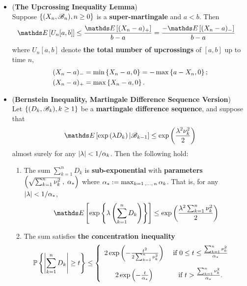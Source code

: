 \documentclass[11pt]{article}
\begin{document}
\begin{itemize}
\item \begin{lemma}(\textbf{The Upcrossing Inequality Lemma}) \citep{billingsley2008probability} \\
Suppose $\left\{(X_n, {\mathscr B}_n), n \ge 0\right\}$ is a \textbf{super-martingale} and $a < b$. Then 
\begin{align}
 \E{}{U_n[a, b]} &\le \frac{\E{}{(X_n - a)_{+}}}{b- a} = \frac{-\E{}{(X_n - a)_{-}}}{b- a} \label{ineqn: supermartingale_upcrossing_inequality}
\end{align} where $U_n[a, b]$ denote \textbf{the total number of upcrossings} of $[a, b]$ up to time $n$, 
\begin{align*}
(X_n - a)_{-} &= \min\left\{X_n-a, 0\right\} = - \max\left\{a - X_n, 0\right\}; \\
(X_n - a)_{+} &= \max\left\{X_n-a, 0\right\}.
\end{align*}
\end{lemma}

\item \begin{theorem} (\textbf{Bernstein Inequality, Martingale Difference Sequence Version}) \citep{wainwright2019high}\\
Let $\left\{(D_k, {\mathscr B}_k), k \ge 1\right\}$ be a \textbf{martingale difference sequence}, and suppose that 
\begin{align*}
\E{}{\exp\paren{\lambda D_k} | \srB_{k-1}} \le \exp\paren{\frac{\lambda^2 \nu_k^2}{2} }
\end{align*} almost surely for any $\left\lvert \lambda \right\rvert < 1/\alpha_k$. Then the following hold:
\begin{enumerate}
\item The sum $\sum_{k=1}^{n}D_k$ is \textbf{sub-exponential} with \textbf{parameters} $\left(\sqrt{\sum_{k=1}^{n}\nu_k^2}\;  , \;\alpha_{*}\right)$ where $\alpha_{*} := \max_{k=1 \,{,}\ldots{,}\, n} \alpha_k$. That is, for any $\left\lvert \lambda \right\rvert < 1/\alpha_{*}$, 
\begin{align*}
\E{}{\exp\set{\lambda \paren{\sum_{k=1}^{n}D_k}}} \le \exp\paren{\frac{\lambda^2\sum_{k=1}^{n}\nu_k^2}{2} }
\end{align*}
\item The sum satisfies \textbf{the concentration inequality}
\begin{align}
{\mathbb P}\left\{\left\lvert \sum_{k=1}^{n}D_k \right\rvert \ge t \right\} &\le \left\{ \begin{array}{cc}
2 \exp\left(- \frac{t^2}{2 \sum_{k=1}^{n}\nu_k^2}\right) & \text{ if } 0 \le t \le \frac{\sum_{k=1}^{n}\nu_k^2}{\alpha_{*}} \\[15pt]
2 \exp\left(- \frac{t}{\alpha_{*}}\right) &\text{ if } t > \frac{\sum_{k=1}^{n}\nu_k^2}{\alpha_{*}}.
\end{array}\right. \label{ineqn: bernstein_inequality_martingale}
\end{align}
\end{enumerate}
\end{theorem}


\end{itemize}
\end{document}
